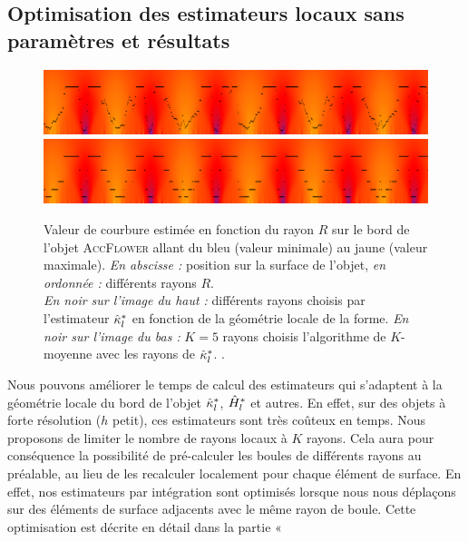 \subsection{Optimisation des estimateurs locaux sans paramètres et résultats}
\label{sec:curvature:parameter-free:k-means}
%
\begin{figure}[ht]{
  \begin{center}
    \includegraphics[width=.95\linewidth]{images/Curvature/ScaleSpace_Flower_Local}
    \includegraphics[width=.95\linewidth]{images/Curvature/ScaleSpace_Flower_Local_5}
  \end{center}}
  \caption[Rayons choisis par  $\CurvHSL$ et répartitions en 5 partitions.]{Valeur de courbure estimée en fonction du rayon $R$ sur le bord de
  l'objet \textsc{AccFlower} allant du bleu (valeur minimale) au jaune (valeur
  maximale). \emph{En abscisse :} position sur la surface de l'objet, \emph{en
  ordonnée :} différents rayons $R$.
  \\
  \emph{En noir sur l'image du haut :} différents rayons choisis par
  l'estimateur $\CurvHSL$ en fonction de la géométrie locale de la forme.
  \emph{En noir sur l'image du bas :} $K = 5$ rayons choisis l'algorithme de
  $K$-moyenne avec les rayons de $\CurvHSL$.
  \label{fig:curvature-pfl-radii}.}
\end{figure}
%
Nous pouvons améliorer le temps de calcul des estimateurs qui s'adaptent à la
géométrie locale du bord de l'objet $\CurvHSL$, $\hat{H}^{*}_{l}$ et autres. En
effet, sur des objets à forte résolution (\cad $h$ petit), ces estimateurs sont
très coûteux en temps. Nous proposons de limiter le nombre de rayons locaux à
$K$ rayons. Cela aura pour conséquence la possibilité de pré-calculer les boules
de différents rayons au préalable, au lieu de les recalculer localement pour
chaque élément de surface. En effet, nos estimateurs par intégration sont
optimisés lorsque nous nous déplaçons sur des éléments de surface adjacents avec
le même rayon de boule. Cette optimisation est décrite en détail dans la partie «
